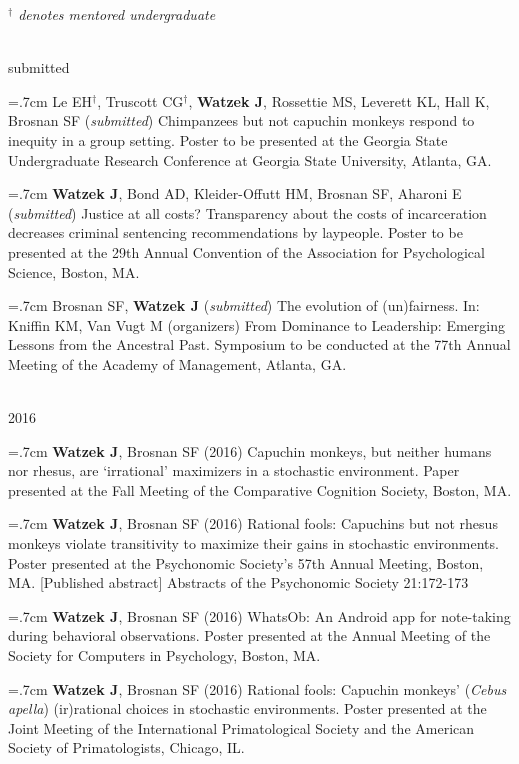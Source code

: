 \documentclass[]{friggeri-cv}
\begin{document}
\hspace{.35cm} {\small{} \emph{${}^\dagger$ denotes mentored undergraduate}}

{\large{} ~\\[-.15cm] submitted}

\hangindent=.7cm Le EH${}^\dagger$, Truscott CG${}^\dagger$, \textbf{Watzek J}, Rossettie MS, Leverett KL, Hall K, Brosnan SF (\emph{submitted}) Chimpanzees but not capuchin monkeys respond to inequity in a group setting. Poster to be presented at the Georgia State Undergraduate Research Conference at Georgia State University, Atlanta, GA.

\hangindent=.7cm \textbf{Watzek J}, Bond AD, Kleider-Offutt HM, Brosnan SF, Aharoni E (\emph{submitted}) Justice at all costs? Transparency about the costs of incarceration decreases criminal sentencing recommendations by laypeople. Poster to be presented at the 29th Annual Convention of the Association for Psychological Science, Boston, MA.

\hangindent=.7cm Brosnan SF, \textbf{Watzek J} (\emph{submitted}) The evolution of (un)fairness. In: Kniffin KM, Van Vugt M (organizers) From Dominance to Leadership: Emerging Lessons from the Ancestral Past. Symposium to be conducted at the 77th Annual Meeting of the Academy of Management, Atlanta, GA.

{\large{} ~\\[-.15cm] 2016}

\hangindent=.7cm \textbf{Watzek J}, Brosnan SF (2016) Capuchin monkeys, but neither humans nor rhesus, are `irrational' maximizers in a stochastic environment. Paper presented at the Fall Meeting of the Comparative Cognition Society, Boston, MA.

\hangindent=.7cm \textbf{Watzek J}, Brosnan SF (2016) Rational fools: Capuchins but not rhesus monkeys violate transitivity to maximize their gains in stochastic environments. Poster presented at the Psychonomic Society's 57th Annual Meeting, Boston, MA. [Published abstract] Abstracts of the Psychonomic Society 21:172-173

\hangindent=.7cm \textbf{Watzek J}, Brosnan SF (2016) WhatsOb: An Android app for note-taking during behavioral observations. Poster presented at the Annual Meeting of the Society for Computers in Psychology, Boston, MA.

\hangindent=.7cm \textbf{Watzek J}, Brosnan SF (2016) Rational fools: Capuchin monkeys' (\emph{Cebus apella}) (ir)rational choices in stochastic environments. Poster presented at the Joint Meeting of the International Primatological Society and the American Society of Primatologists, Chicago, IL.
\end{document}
